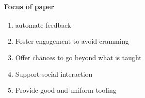\paragraph{Focus of paper}
\begin{enumerate}
\item automate feedback
\item Foster engagement to avoid cramming
\item Offer chances to go beyond what is taught
\item Support social interaction
\item Provide good and uniform tooling
\end{enumerate}

